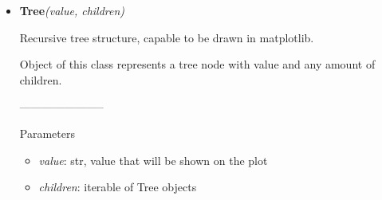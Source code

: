 \documentclass[a4paper,12pt]{amsart}
\begin{document}
\begin{itemize}
	Parameters
	\begin{itemize}
		\item \textit{*words} : elements for the result trie
	\end{itemize}

	-----------------------
	
	Examples

	\begin{lstlisting}[language=python]
	
	>>> trie = Trie("word", "word2", "word3", "w", "wo", "next")
	>>> print(trie)
	Trie({'w': {'o': {'r': {'d': {'': '', '2': {'': ''}, '3': {'': ''}}}, '': ''}, '': ''}, 'n': {'e': {'x': {'t': {'': ''}}}}})
	>>> 'word' in trie
	True
	>>> 'word123' in trie
	False
	>>> 'wor' in trie
	False
	>>> trie.add('word1231')
	>>> 'word1231' in trie
	True
	>>> trie.remove('w')
	>>> 'w' in trie
	False
	>>> list(trie)
	['word', 'word2', 'word3', 'word1231', 'wo', 'next']
	>>> trie.max_prefix('word123next')
	('word', '123next')
	\end{lstlisting}
	
	-----------------------

	Raises
	
	\begin{itemize}
		\item \textit{TypeError}  : when called methods \_\_getitem\_\_, \_\_setitem\_\_, \_\_delitem\_\_
	\end{itemize}

	-----------------------

	\textit{Notes}

	Trie is based on TriedDict, however it doesn't support container
	protocol and therefore doesn't have attributes keys, values and items.
	
	\vspace{1cm}
	\item[class] \textbf{Tree}\textit{(value, children)}
	
	Recursive tree structure, capable to be drawn in matplotlib.
	
	Object of this class represents a tree node with value and any amount
	of children.
	
	-----------------------
	
	Parameters
	
	\begin{itemize} 
		
		\item[-] \textit{value}: str, value that will be shown on the plot
		\item[-] \textit{children}: iterable of Tree objects
	

\end{itemize}
\end{itemize}
\end{document}
